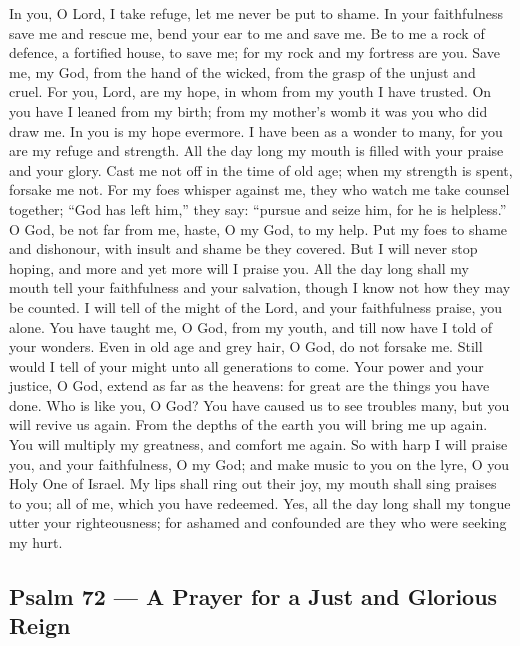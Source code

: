  In you, O Lord, I take refuge, let me never be put to
shame.  In your faithfulness save me and rescue me, bend
your ear to me and save me.  Be to me a rock of defence, a
fortified house, to save me; for my rock and my fortress are you.
 Save me, my God, from the hand of the wicked, from the
grasp of the unjust and cruel.  For you, Lord, are my hope,
in whom from my youth I have trusted.  On you have I leaned
from my birth; from my mother's womb it was you who did draw me. In you
is my hope evermore.  I have been as a wonder to many, for
you are my refuge and strength.  All the day long my mouth
is filled with your praise and your glory.  Cast me not off
in the time of old age; when my strength is spent, forsake me not.
 For my foes whisper against me, they who watch me take
counsel together;  ``God has left him,'' they say: ``pursue
and seize him, for he is helpless.''  O God, be not far
from me, haste, O my God, to my help.  Put my foes to shame
and dishonour, with insult and shame be they covered.  But
I will never stop hoping, and more and yet more will I praise you.
 All the day long shall my mouth tell your faithfulness and
your salvation, though I know not how they may be counted. 
I will tell of the might of the Lord, and your faithfulness praise, you
alone.  You have taught me, O God, from my youth, and till
now have I told of your wonders.  Even in old age and grey
hair, O God, do not forsake me. Still would I tell of your might unto
all generations to come.  Your power and your justice, O
God, extend as far as the heavens: for great are the things you have
done. Who is like you, O God?  You have caused us to see
troubles many, but you will revive us again. From the depths of the
earth you will bring me up again.  You will multiply my
greatness, and comfort me again.  So with harp I will
praise you, and your faithfulness, O my God; and make music to you on
the lyre, O you Holy One of Israel.  My lips shall ring out
their joy, my mouth shall sing praises to you; all of me, which you have
redeemed.  Yes, all the day long shall my tongue utter your
righteousness; for ashamed and confounded are they who were seeking my
hurt.

\hypertarget{psalm-72-a-prayer-for-a-just-and-glorious-reign}{%
\subsection{Psalm 72 --- A Prayer for a Just and Glorious
Reign}\label{psalm-72-a-prayer-for-a-just-and-glorious-reign}}

